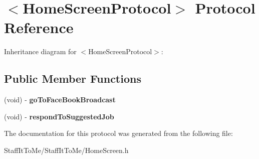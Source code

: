 \hypertarget{protocol_home_screen_protocol-p}{
\section{$<$\-Home\-Screen\-Protocol$>$ \-Protocol \-Reference}
\label{protocol_home_screen_protocol-p}
}


\-Inheritance diagram for $<$\-Home\-Screen\-Protocol$>$\-:
\subsection*{\-Public \-Member \-Functions}
\begin{DoxyCompactItemize}
\item 
\hypertarget{protocol_home_screen_protocol-p_a2df660849bcf854a09e7426dd709a14e}{
(void) -\/ {\bfseries go\-To\-Face\-Book\-Broadcast}}
\label{protocol_home_screen_protocol-p_a2df660849bcf854a09e7426dd709a14e}

\item 
\hypertarget{protocol_home_screen_protocol-p_a1612c8bacf81df1e6b80fc77b8157a62}{
(void) -\/ {\bfseries respond\-To\-Suggested\-Job}}
\label{protocol_home_screen_protocol-p_a1612c8bacf81df1e6b80fc77b8157a62}

\end{DoxyCompactItemize}


\-The documentation for this protocol was generated from the following file\-:\begin{DoxyCompactItemize}
\item 
\-Staff\-It\-To\-Me/\-Staff\-It\-To\-Me/\-Home\-Screen.\-h\end{DoxyCompactItemize}
